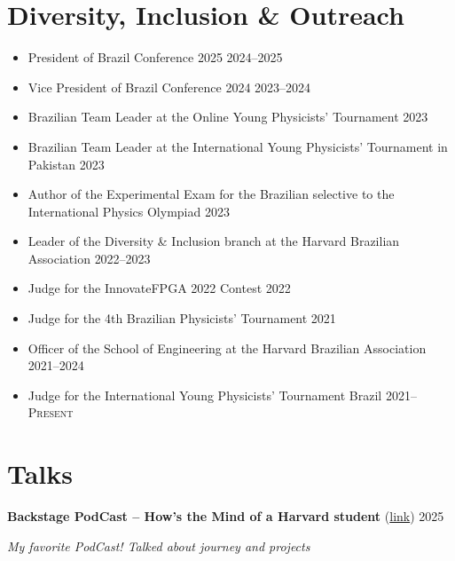 \documentclass[letterpaper,10pt]{article}
\newcommand{\entry}[4]{

\begin{minipage}[t]{.15\textwidth}
\end{minipage}
\hfill\vline\hfill 
\begin{minipage}[t]{0.95\textwidth}
#2 \hfill \textsc{#1}

\textit{#3}

\footnotesize{#4}
\end{minipage}\\\vspace{.25cm}}
\newcommand{\mycomment}[1]{}
\begin{document}
\section{Diversity, Inclusion \& Outreach}
\begin{itemize}
	\item President of Brazil Conference 2025
    \hfill\textsc{2024--2025}

    \item Vice President of Brazil Conference 2024
    \hfill\textsc{2023--2024}

    \item Brazilian Team Leader at the Online Young Physicists' Tournament
    \hfill\textsc{2023}

	\item Brazilian Team Leader at the International Young Physicists' Tournament in Pakistan
    \hfill\textsc{2023}

    \item Author of the Experimental Exam for the Brazilian selective to the International Physics Olympiad
    \hfill\textsc{2023}

    \item Leader of the Diversity \& Inclusion branch at the Harvard Brazilian Association
	\hfill\textsc{2022--2023}

	\item Judge for the InnovateFPGA 2022 Contest
    \hfill\textsc{2022}

    \item Judge for the 4th Brazilian Physicists' Tournament
    \hfill\textsc{2021}

    \item Officer of the School of Engineering at the Harvard Brazilian Association
	\hfill\textsc{2021--2024}

    \item Judge for the International Young Physicists' Tournament Brazil
	\hfill\textsc{2021--Present}
	\end{itemize}
\vspace*{-.25cm}
\section{Talks}

\entry{2025}{\textbf{Backstage PodCast -- How's the Mind of a Harvard student} (\href{https://www.youtube.com/watch?v=lUqDgKRqxhY}{link})}{My favorite PodCast! Talked about journey and projects}{}
\end{document}
